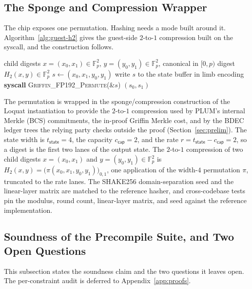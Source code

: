 \subsection{The Sponge and Compression Wrapper}\label{ssec:sponge}
The chip exposes one permutation. Hashing needs a mode built around it. Algorithm~\ref{alg:guest-h2} gives the guest-side $2$-to-$1$ compression built on the syscall, and the construction follows.
\begin{algorithm}[H]
\caption{Guest-side 2-to-1 compression $H_2$ via the
  \textsc{Griffin\_FP192\_Permute} syscall}
\label{alg:guest-h2}
\begin{algorithmic}[1]
\Require child digests $x=(x_0,x_1)\in\mathbb{F}_p^2$,
         $y=(y_0,y_1)\in\mathbb{F}_p^2$, canonical in $[0,p)$
\Ensure  digest $H_2(x,y)\in\mathbb{F}_p^2$
\State $s \gets (x_0, x_1, y_0, y_1)$
\State write $s$ to the state buffer in limb encoding
\State \textbf{syscall} \textsc{Griffin\_FP192\_Permute}(\&$s$)
\State \Return $(s_0, s_1)$
\end{algorithmic}
\end{algorithm}

The permutation is wrapped in the sponge/compression construction of the Loquat instantiation to provide the $2$-to-$1$ compression used by PLUM's internal Merkle (BCS) commitments, the in-proof Griffin Merkle cost, and by the BDEC ledger trees the relying party checks outside the proof (Section~\ref{sec:prelim}). The state width is $t_{\mathsf{state}}=4$, the capacity $c_{\mathsf{cap}}=2$, and the rate $r=t_{\mathsf{state}}-c_{\mathsf{cap}}=2$, so a digest is the first two lanes of the output state. The $2$-to-$1$ compression of two child digests $x=(x_0,x_1)$ and $y=(y_0,y_1)\in\mathbb{F}_p^{2}$ is $H_2(x,y)=\big(\pi(x_0,x_1,y_0,y_1)\big)_{0,1}$, one application of the width-$4$ permutation $\pi$, truncated to the rate lanes. The SHAKE256 domain-separation seed and the linear-layer matrix are matched to the reference hasher, and cross-codebase tests pin the modulus, round count, linear-layer matrix, and seed against the reference implementation.

\subsection{Soundness of the Precompile Suite, and Two Open Questions}\label{ssec:soundness}
This subsection states the soundness claim and the two questions it leaves open. The per-constraint audit is deferred to Appendix~\ref{app:proofs}.

